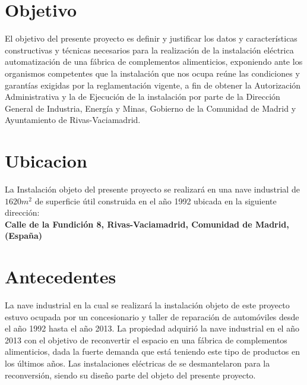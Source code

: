 \newpage
\section{Objetivo}
El objetivo del presente proyecto es definir y justificar los datos y características constructivas y técnicas necesarios para la realización de la instalación eléctrica automatización de una fábrica de complementos alimenticios, exponiendo ante los organismos competentes que la instalación que nos ocupa reúne las condiciones y garantías exigidas por la reglamentación vigente, a fin de obtener la Autorización Administrativa y la de Ejecución de la instalación por parte de la Dirección General de Industria, Energía y Minas, Gobierno de la Comunidad de Madrid y Ayuntamiento de Rivas-Vaciamadrid.\
 
\section{Ubicacion}

La Instalación objeto del presente proyecto se realizará en una nave industrial de $1620m^2$ de superficie útil construida en el año 1992 ubicada en la siguiente dirección:\\

 {\bfseries Calle de la Fundición 8, Rivas-Vaciamadrid, Comunidad de Madrid, (España)}

\section{Antecedentes}

La nave industrial en la cual se realizará la instalación objeto de este proyecto estuvo ocupada por un concesionario y taller de reparación de automóviles desde el año 1992 hasta el año 2013. La propiedad adquirió la nave industrial en el año 2013 con el objetivo de reconvertir el espacio en una fábrica de complementos alimenticios, dada la fuerte demanda que está teniendo este tipo de productos en los últimos años. Las instalaciones eléctricas de se desmantelaron para la reconversión, siendo su diseño parte del objeto del presente proyecto.\

